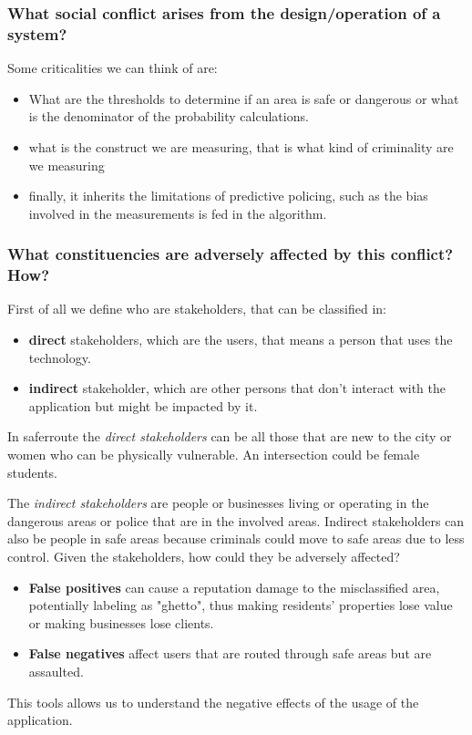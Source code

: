 \subsubsection{What social conflict arises from the design/operation of a system?}
Some criticalities we can think of are:
\begin{itemize}
    \item What are the thresholds to determine if an area is safe or dangerous or what is the denominator of the probability calculations.
    \item what is the construct we are measuring, that is what kind of criminality are we measuring
    \item finally, it inherits the limitations of predictive policing, such as the bias involved in the measurements is fed in the algorithm.
\end{itemize}
\subsubsection{What constituencies are adversely affected by this conflict? How?}
First of all we define who are stakeholders, that can be classified in:
\begin{itemize}
    \item \textbf{direct} stakeholders, which are the users, that means a person that uses the technology.
    \item \textbf{indirect} stakeholder, which are other persons that don't interact with the application but might be impacted by it.
\end{itemize}
In saferroute the \textit{direct stakeholders} can be all those that are new to the city or women who can be physically vulnerable. An intersection could be female students. 

The \textit{indirect stakeholders} are people or businesses living or operating in the dangerous areas or police that are in the involved areas. Indirect stakeholders can also be people in safe areas because criminals could move to safe areas due to less control. 
Given the stakeholders, how could they be adversely affected? 
\begin{itemize}
    \item \textbf{False positives} can cause a reputation damage to the misclassified area, potentially labeling as "ghetto", thus making residents' properties lose value or making businesses lose clients.
    \item \textbf{False negatives} affect users that are routed through safe areas but are assaulted.
\end{itemize}
This tools allows us to understand the negative effects of the usage of the application. 
